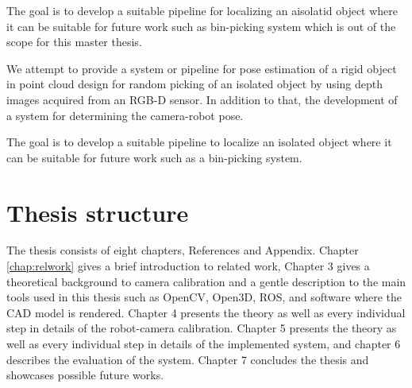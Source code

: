 The goal is to develop a suitable pipeline for localizing an aisolatid object where it can be suitable for future work such as bin-picking system which is out of the scope for this master thesis.
\fi

We attempt to provide a system or pipeline for pose estimation of a rigid object in point cloud design for random picking of an isolated object by using depth images acquired from an RGB-D sensor. In addition to that, the development of a system for determining the camera-robot pose.

The goal is to develop a suitable pipeline to localize an isolated object where it can be suitable for future work such as a bin-picking system.


\section{Thesis structure}

The thesis consists of eight chapters, References and Appendix. Chapter \ref{chap:relwork} gives a brief introduction to related work, Chapter 3 gives a theoretical background to camera calibration and a gentle description to the main tools used in this thesis such as OpenCV, Open3D, ROS, and software where the CAD model is rendered. Chapter 4 presents the theory as well as every individual step in details of the robot-camera calibration. Chapter 5 presents the theory as well as every individual step in details of the implemented system, and chapter 6 describes the evaluation of the system. Chapter 7 concludes the thesis and showcases possible future works. 

